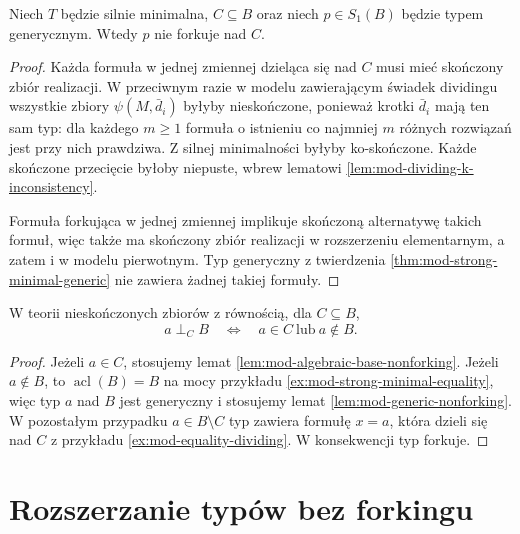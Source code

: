 \begin{lemat}
\label{lem:mod-generic-nonforking}
Niech $T$ będzie silnie minimalna,
$C\subseteq B$ oraz niech $p\in S_1(B)$
będzie typem generycznym.
Wtedy $p$ nie forkuje nad $C$.
\end{lemat}
\begin{proof}
Każda formuła w jednej zmiennej dzieląca się
nad $C$ musi mieć skończony zbiór realizacji.
W przeciwnym razie w modelu zawierającym
świadek dividingu wszystkie zbiory
$\psi(M,\bar d_i)$ byłyby nieskończone,
ponieważ krotki $\bar d_i$ mają ten sam typ:
dla każdego $m\geq1$ formuła o istnieniu co najmniej
$m$ różnych rozwiązań jest przy nich prawdziwa.
Z silnej minimalności byłyby ko-skończone.
Każde skończone przecięcie byłoby niepuste,
wbrew lematowi
\ref{lem:mod-dividing-k-inconsistency}.

Formuła forkująca w jednej zmiennej
implikuje skończoną alternatywę takich
formuł, więc także ma skończony zbiór
realizacji w rozszerzeniu elementarnym,
a zatem i w modelu pierwotnym.
Typ generyczny z twierdzenia
\ref{thm:mod-strong-minimal-generic}
nie zawiera żadnej takiej formuły.
\end{proof}

\begin{wniosek}
\label{cor:mod-equality-forking}
W teorii nieskończonych zbiorów z równością,
dla $C\subseteq B$,
\[
a\mathrel{\perp_C}B
\quad\Longleftrightarrow\quad
a\in C\ \text{lub}\ a\notin B.
\]
\end{wniosek}
\begin{proof}
Jeżeli $a\in C$, stosujemy lemat
\ref{lem:mod-algebraic-base-nonforking}.
Jeżeli $a\notin B$, to
$\operatorname{acl}(B)=B$ na mocy przykładu
\ref{ex:mod-strong-minimal-equality},
więc typ $a$ nad $B$ jest generyczny
i stosujemy lemat \ref{lem:mod-generic-nonforking}.
W pozostałym przypadku $a\in B\setminus C$
typ zawiera formułę $x=a$, która dzieli się
nad $C$ z przykładu \ref{ex:mod-equality-dividing}.
W konsekwencji typ forkuje.
\end{proof}

\section{Rozszerzanie typów bez forkingu}

